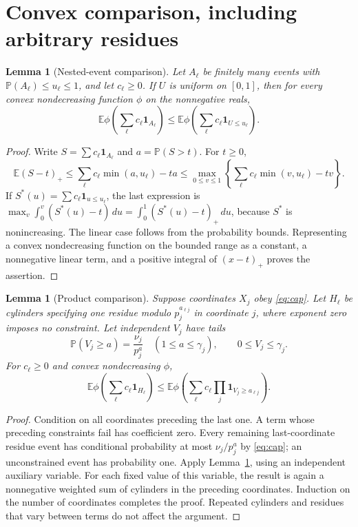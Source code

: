 \documentclass[11pt]{article}
\newtheorem{lemma}[theorem]{Lemma}
\newcommand{\E}{\mathbb E}
\newcommand{\Pp}{\mathbb P}
\newcommand{\pos}[1]{(#1)_+}
\begin{document}
\section{Convex comparison, including arbitrary residues}
\begin{lemma}[Nested-event comparison]\label{lem:nested}
Let $A_\ell$ be finitely many events with $\Pp(A_\ell)\leq u_\ell\leq1$,
and let $c_\ell\geq0$. If $U$ is uniform on $[0,1]$, then for every convex
nondecreasing function $\phi$ on the nonnegative reals,
\[
 \E\phi\left(\sum_\ell c_\ell\mathbf1_{A_\ell}\right)
 \leq\E\phi\left(\sum_\ell c_\ell\mathbf1_{U\leq u_\ell}\right).
\]
\end{lemma}
\begin{proof}
Write $S=\sum c_\ell\mathbf1_{A_\ell}$ and $a=\Pp(S>t)$. For $t\geq0$,
\[
 \E\pos{S-t}
 \leq\sum_\ell c_\ell\min(a,u_\ell)-ta
 \leq\max_{0\leq v\leq1}
       \left\{\sum_\ell c_\ell\min(v,u_\ell)-tv\right\}.
\]
If $S^*(u)=\sum c_\ell\mathbf1_{u\leq u_\ell}$, the last expression is
$\max_v\int_0^v(S^*(u)-t)\,du=\int_0^1\pos{S^*(u)-t}\,du$,
because $S^*$ is nonincreasing. The linear case follows from the probability
bounds. Representing a convex nondecreasing function on the bounded range
as a constant, a nonnegative linear term, and a positive integral of
$(x-t)_+$ proves the assertion.
\end{proof}

\begin{lemma}[Product comparison]\label{lem:product}
Suppose coordinates $X_j$ obey \eqref{eq:cap}. Let $H_\ell$ be cylinders
specifying one residue modulo $p_j^{a_{\ell j}}$ in coordinate $j$, where
exponent zero imposes no constraint. Let independent $V_j$ have tails
\[
 \Pp(V_j\geq a)=\frac{\nu_j}{p_j^a}\quad(1\leq a\leq\gamma_j),
 \qquad 0\leq V_j\leq\gamma_j.
\]
For $c_\ell\geq0$ and convex nondecreasing $\phi$,
\[
 \E\phi\left(\sum_\ell c_\ell\mathbf1_{H_\ell}\right)
 \leq\E\phi\left(\sum_\ell c_\ell
              \prod_j\mathbf1_{V_j\geq a_{\ell j}}\right).
\]
\end{lemma}
\begin{proof}
Condition on all coordinates preceding the last one. A term whose preceding
constraints fail has coefficient zero. Every remaining last-coordinate
residue event has conditional probability at most $\nu_j/p_j^a$ by
\eqref{eq:cap}; an unconstrained event has probability one. Apply
Lemma~\ref{lem:nested}, using an independent auxiliary variable.
For each fixed value of this variable, the result is again a nonnegative
weighted sum of cylinders in the preceding coordinates. Induction on the
number of coordinates completes the proof. Repeated cylinders and residues
that vary between terms do not affect the argument.
\end{proof}
\end{document}
